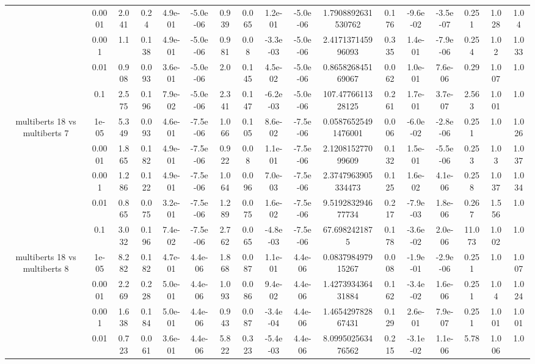 \begin{tabular}{|c|c|c|c|c|c|c|c|c|c|c|c|c|c|c|c|c|}
 & 0.0001 & 2.041 & 0.24 & 4.9e-01 & -5.0e-06 & 0.939 & 0.065 & 1.2e-01 & -5.0e-06 & 1.7908892631530762 & 0.176 & -9.6e-02 & -3.5e-07 & 0.251 & 1.028 & 1.04 \\
 & 0.001 & 1.1 & 0.138 & 4.9e-01 & -5.0e-06 & 0.981 & 0.08 & -3.3e-03 & -5.0e-06 & 2.417137145996093 & 0.335 & 1.4e-01 & -7.9e-06 & 0.254 & 1.02 & 1.033 \\
 & 0.01 & 0.908 & 0.093 & 3.6e-01 & -5.0e-06 & 2.0 & 0.145 & 4.5e-02 & -5.0e-06 & 0.865826845169067 & 0.062 & 1.0e-01 & 7.6e-06 & 0.29 & 1.007 & 1.0 \\
 & 0.1 & 2.575 & 0.196 & 7.9e-02 & -5.0e-06 & 2.341 & 0.147 & -6.2e-03 & -5.0e-06 & 107.4776611328125 & 0.261 & 1.7e-01 & 3.7e-07 & 2.563 & 1.001 & 1.0 \\
\hline
\multirow{5}{*}{multiberts 18 vs multiberts 7} & 1e-05 & 5.349 & 0.093 & 4.6e-01 & -7.5e-06 & 1.066 & 0.105 & 8.6e-02 & -7.5e-06 & 0.05876525491476001 & 0.006 & -6.0e-02 & -2.8e-06 & 0.251 & 1.0 & 1.026 \\
 & 0.0001 & 1.865 & 0.182 & 4.9e-01 & -7.5e-06 & 0.922 & 0.08 & 1.1e-01 & -7.5e-06 & 2.120815277099609 & 0.132 & 1.5e-01 & -5.5e-06 & 0.253 & 1.03 & 1.037 \\
 & 0.001 & 1.286 & 0.122 & 4.9e-01 & -7.5e-06 & 1.064 & 0.096 & 7.0e-03 & -7.5e-06 & 2.3747963905334473 & 0.125 & 1.6e-02 & 4.1e-06 & 0.258 & 1.037 & 1.034 \\
 & 0.01 & 0.865 & 0.075 & 3.2e-01 & -7.5e-06 & 1.289 & 0.075 & 1.6e-02 & -7.5e-06 & 9.519283294677734 & 0.217 & -7.9e-03 & 1.8e-06 & 0.267 & 1.556 & 1.0 \\
 & 0.1 & 3.032 & 0.196 & 7.4e-02 & -7.5e-06 & 2.762 & 0.065 & -4.8e-03 & -7.5e-06 & 67.6982421875 & 0.178 & -3.6e-02 & 2.0e-06 & 11.073 & 1.002 & 1.0 \\
\hline
\multirow{5}{*}{multiberts 18 vs multiberts 8} & 1e-05 & 8.282 & 0.182 & 4.7e-01 & 4.4e-06 & 1.868 & 0.087 & 1.1e-01 & 4.4e-06 & 0.083798497915267 & 0.008 & -1.9e-01 & -2.9e-06 & 0.251 & 1.0 & 1.007 \\
 & 0.0001 & 2.269 & 0.228 & 5.0e-01 & 4.4e-06 & 1.093 & 0.086 & 9.4e-02 & 4.4e-06 & 1.427393436431884 & 0.162 & -3.4e-02 & 1.6e-06 & 0.251 & 1.04 & 1.024 \\
 & 0.001 & 1.638 & 0.184 & 5.0e-01 & 4.4e-06 & 0.943 & 0.087 & -3.4e-04 & 4.4e-06 & 1.465429782867431 & 0.129 & 2.6e-01 & 7.9e-07 & 0.251 & 1.001 & 1.001 \\
 & 0.01 & 0.723 & 0.061 & 3.6e-01 & 4.4e-06 & 5.822 & 0.323 & -5.4e-03 & 4.4e-06 & 8.099502563476562 & 0.215 & -3.1e-02 & 1.1e-06 & 5.78 & 1.006 & 1.0 \\

\end{tabular}
